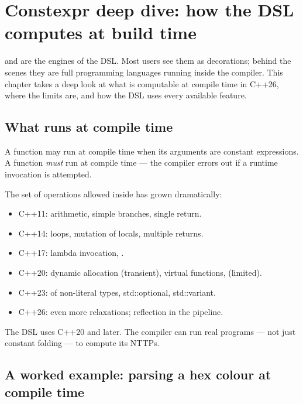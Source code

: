 \chapter{Constexpr deep dive: how the DSL computes at build time}
\label{ch:constexpr-deep}

\begin{aside}
 and  are the engines of the
DSL. Most users see them as decorations; behind the scenes they
are full programming languages running inside the compiler. This
chapter takes a deep look at what is computable at compile time
in C++26, where the limits are, and how the DSL uses every
available feature.
\end{aside}

\section{What runs at compile time}

A  function may run at compile time when its
arguments are constant expressions. A  function
\emph{must} run at compile time --- the compiler errors out if a
runtime invocation is attempted.

The set of operations allowed inside  has
grown dramatically:

\begin{itemize}[leftmargin=*]
  \item C++11: arithmetic, simple branches, single return.
  \item C++14: loops, mutation of locals, multiple returns.
  \item C++17: lambda invocation, .
  \item C++20: dynamic allocation (transient), virtual functions,
     (limited).
  \item C++23:  of non-literal types,
     std::optional, std::variant.
  \item C++26: even more relaxations; reflection in the pipeline.
\end{itemize}

The DSL uses C++20 and later. The compiler can run real
programs --- not just constant folding --- to compute its NTTPs.

\section{A worked example: parsing a hex colour at compile time}

